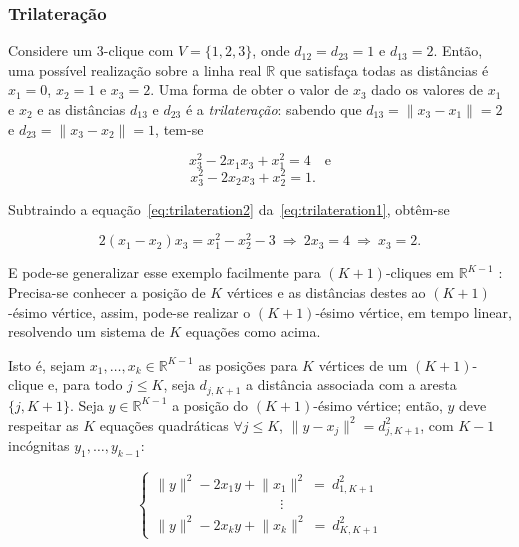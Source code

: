\documentclass[a4paper,12pt]{article}
\begin{document}
\subsubsection{Trilateração}

Considere um 3-clique com $V = \{1,2,3\}$, onde $d_{12} = d_{23} = 1$ e $d_{13} = 2$. Então, uma possível realização sobre a linha real $\mathbb{R}$ que satisfaça todas as distâncias é $x_1 = 0$, $x_2 = 1$ e $x_3 = 2$. Uma forma de obter o valor de $x_3$ dado os valores de $x_1$ e $x_2$ e as distâncias $d_{13}$ e $d_{23}$ é a \textit{trilateração}: sabendo que $d_{13} = \lVert x_3 - x_1\rVert = 2$ e $d_{23} = \lVert x_3 - x_2 \rVert = 1$, tem-se

\begin{equation}
	x_3^2 - 2x_1x_3 +x_1^2 = 4 \quad \textrm{e}
	\label{eq:trilateration1}
\end{equation}
\begin{equation}
x_3^2 - 2x_2x_3 +x_2^2 = 1. \quad
\label{eq:trilateration2}
\end{equation}

Subtraindo a equação~\ref{eq:trilateration2} da~\ref{eq:trilateration1}, obtêm-se

\begin{equation*}
	2(x_1-x_2)x_3 = x_1^2 - x_2^2 - 3 \ \Rightarrow \ 2x_3 = 4 \ \Rightarrow \ x_3 = 2.
\end{equation*}

E pode-se generalizar esse exemplo facilmente para $(K+1)$-cliques em $\mathbb{R}^{K-1}$ \cite{libertiEDG}: Precisa-se conhecer a posição de $K$ vértices e as distâncias destes ao $(K+1)$-ésimo vértice, assim, pode-se realizar o $(K+1)$-ésimo vértice, em tempo linear, resolvendo um sistema de $K$ equações como acima.

Isto é, sejam $x_1, \dots, x_k \in \mathbb{R}^{K-1}$ as posições para $K$ vértices de um $(K+1)$-clique e, para todo $j\leq K$, seja $d_{j,K+1}$ a distância associada com a aresta $\{j, K+1\}$. Seja $y \in \mathbb{R}^{K-1}$ a posição do $(K+1)$-ésimo vértice; então, $y$ deve respeitar as $K$ equações quadráticas $\forall j\leq K$, $\lVert y-x_j\rVert^2 = d_{j,K+1}^2$, com $K-1$ incógnitas  $y_1, \dots,y_{k-1}$:

\begin{equation}
	\begin{cases} 
		\lVert y \rVert^2 -2x_1y + \lVert x_1\rVert^2 \ = \ d^2_{1,K+1}
		\\
		\qquad\qquad\qquad\quad\qquad \!\vdots
		\\
		\lVert y \rVert^2 -2x_ky + \lVert x_k\rVert^2 \ = \ d^2_{K,K+1}
	\end{cases}
	\label{eq:DGPsistemaEquacoes1}
\end{equation}
\end{document}
